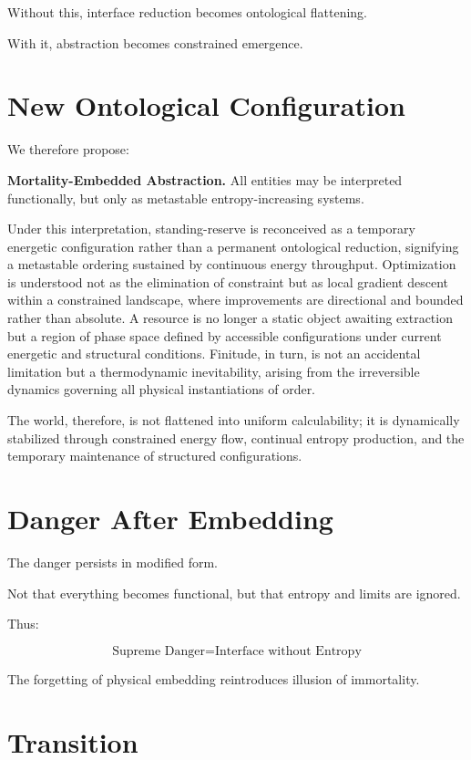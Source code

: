 \documentclass[11pt,openany]{book}
\begin{document}
Without this, interface reduction becomes ontological flattening.

With it, abstraction becomes constrained emergence.

\section{New Ontological Configuration}

We therefore propose:

\medskip

\textbf{Mortality-Embedded Abstraction.}
All entities may be interpreted functionally,
but only as metastable entropy-increasing systems.

\medskip

Under this interpretation, standing-reserve is reconceived as a temporary energetic 
configuration rather than a permanent ontological reduction, signifying a metastable 
ordering sustained by continuous energy throughput. Optimization is understood not as 
the elimination of constraint but as local gradient descent within a constrained landscape, 
where improvements are directional and bounded rather than absolute. A resource is no 
longer a static object awaiting extraction but a region of phase space defined by 
accessible configurations under current energetic and structural conditions. Finitude, 
in turn, is not an accidental limitation but a thermodynamic inevitability, arising from 
the irreversible dynamics governing all physical instantiations of order. 

The world, therefore, is not flattened into uniform calculability; it is dynamically 
stabilized through constrained energy flow, continual entropy production, and the 
temporary maintenance of structured configurations.

\section{Danger After Embedding}

The danger persists in modified form.

Not that everything becomes functional,
but that entropy and limits are ignored.

Thus:

\[
\text{Supreme Danger} = \text{Interface without Entropy}
\]

The forgetting of physical embedding reintroduces illusion of immortality.

\section{Transition}
\end{document}
